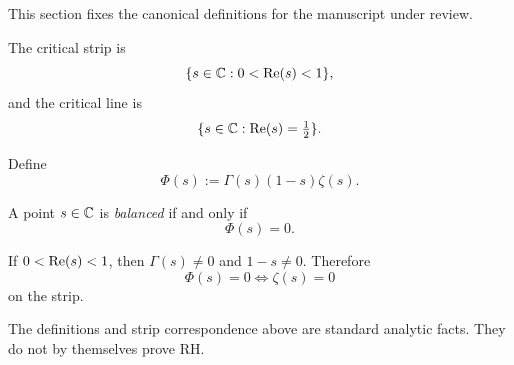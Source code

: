 This section fixes the canonical definitions for the manuscript under review.

\begin{definition}
The critical strip is
\[
\{s\in\mathbb{C}:0<\operatorname{Re}(s)<1\},
\]
and the critical line is
\[
\{s\in\mathbb{C}:\operatorname{Re}(s)=\tfrac12\}.
\]
\end{definition}

\begin{definition}
\label{def:phi-canonical}
Define
\[
\Phi(s):=\Gamma(s)(1-s)\zeta(s).
\]
\end{definition}

\begin{definition}
\label{def:balanced-point}
A point $s\in\mathbb{C}$ is \emph{balanced} if and only if
\[
\Phi(s)=0.
\]
\end{definition}

\begin{remark}
\label{rem:strip-correspondence}
If $0<\operatorname{Re}(s)<1$, then $\Gamma(s)\neq 0$ and $1-s\neq 0$. Therefore
\[
\Phi(s)=0\iff \zeta(s)=0
\]
on the strip.
\end{remark}

\begin{remark}
The definitions and strip correspondence above are standard analytic facts.
They do not by themselves prove RH.
\end{remark}
